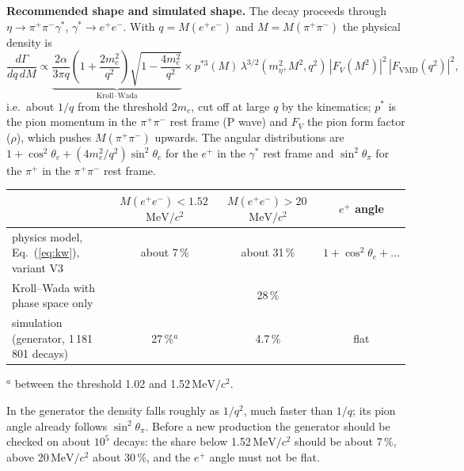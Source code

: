 \documentclass[11pt,a4paper]{article}
\newcommand{\pip}{\ensuremath{\pi^{+}}\xspace}
\newcommand{\ee}{\ensuremath{e^{+}e^{-}}\xspace}
\newcommand{\pipi}{\ensuremath{\pi^{+}\pi^{-}}\xspace}
\newcommand{\Mee}{\ensuremath{M(e^{+}e^{-})}\xspace}
\newcommand{\Mpipi}{\ensuremath{M(\pi^{+}\pi^{-})}\xspace}
\newcommand{\MeVcc}{\ensuremath{\mathrm{MeV}/c^{2}}\xspace}
\begin{document}
\textbf{Recommended shape and simulated shape.} The decay proceeds through
$\eta\to\pipi\gamma^*$, $\gamma^*\to\ee$. With $q = \Mee$ and $M = \Mpipi$ the physical density is
\begin{equation}
\frac{d\Gamma}{dq\,dM} \propto \underbrace{\frac{2\alpha}{3\pi q}\left(1+\frac{2m_e^2}{q^2}\right)\sqrt{1-\frac{4m_e^2}{q^2}}}_{\text{Kroll--Wada}}
\times p^{*3}(M)\,\lambda^{3/2}(m_\eta^2, M^2, q^2)\,|F_V(M^2)|^2\,|F_{\mathrm{VMD}}(q^2)|^2 ,
\label{eq:kw}
\end{equation}
i.e.\ about $1/q$ from the threshold $2m_e$, cut off at large $q$ by the kinematics; $p^*$ is the pion
momentum in the \pipi rest frame (P wave) and $F_V$ the pion form factor ($\rho$), which pushes \Mpipi
upwards. The angular distributions are $1+\cos^2\theta_e+(4m_e^2/q^2)\sin^2\theta_e$ for the $e^+$ in
the $\gamma^*$ rest frame and $\sin^2\theta_\pi$ for the \pip in the \pipi rest frame.
\begin{center}
\footnotesize
\setlength{\tabcolsep}{4pt}
\begin{tabular}{@{}l c c c@{}}
\toprule
 & $\Mee<1.52$\,\MeVcc & $\Mee>20$\,\MeVcc & $e^+$ angle \\
\midrule
physics model, Eq.~(\ref{eq:kw}), variant V3 & about 7\,\% & about 31\,\% & $1+\cos^2\theta_e+\ldots$ \\
Kroll--Wada with phase space only                   &             & 28\,\%       & \\
simulation (generator, 1\,181\,801 decays)           & 27\,\%$^{a}$ & 4.7\,\% & flat \\
\bottomrule
\end{tabular}

{\footnotesize $^{a}$ between the threshold 1.02 and 1.52\,\MeVcc.}
\end{center}
In the generator the density falls roughly as $1/q^2$, much faster than $1/q$; its pion angle already
follows $\sin^2\theta_\pi$. Before a new production the generator should be checked on about $10^5$
decays: the share below 1.52\,\MeVcc should be about 7\,\%, above 20\,\MeVcc about 30\,\%, and the $e^+$
angle must not be flat.
\end{document}
